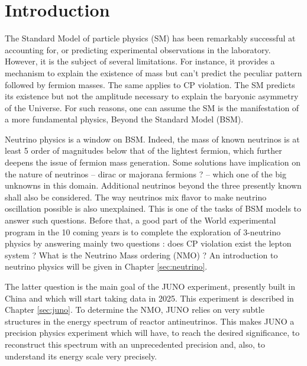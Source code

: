 \chapter*{Introduction}

The Standard Model of particle physics (SM) has been remarkably successful at accounting for, or predicting experimental observations in the laboratory.
However, it is the subject of several limitations. For instance, it provides a mechanism to explain the existence of mass but can't predict the peculiar pattern followed by fermion masses.
The same applies to CP violation. The SM predicts its existence but not the amplitude necessary to explain the baryonic asymmetry of the Universe. For such reasons, one can assume the SM is the manifestation of a more fundamental physics, Beyond the Standard Model (BSM).

Neutrino physics is a window on BSM. Indeed, the mass of known neutrinos is at least 5 order of magnitudes below that of the lightest fermion, which further deepens
the issue of fermion mass generation.
Some solutions have implication on the nature of neutrinos -- dirac or majorana fermions ?  --  which one of the big unknowns in this domain. Additional neutrinos beyond the three presently known shall also be considered. The way neutrinos mix flavor to make neutrino oscillation possible is also unexplained.
This is one of the tasks of BSM models to answer such questions. Before that, a good part of the World experimental program in the 10 coming years is to complete the exploration of 3-neutrino physics by answering mainly two questions :
does CP violation exist the lepton system ? What is the Neutrino Mass ordering (NMO) ?
An introduction to neutrino physics will be given in Chapter \ref{sec:neutrino}.

\hfill

The latter question is the main goal of the JUNO experiment, presently built in China and which will start taking data in 2025.
This experiment is described in Chapter \ref{sec:juno}.
To determine the NMO, JUNO relies on very subtle structures in the energy spectrum of reactor antineutrinos. This makes JUNO a precision physics experiment which will have, to reach the desired significance, to reconstruct this spectrum with an unprecedented precision and, also, to understand its energy scale very precisely.

\hfill

